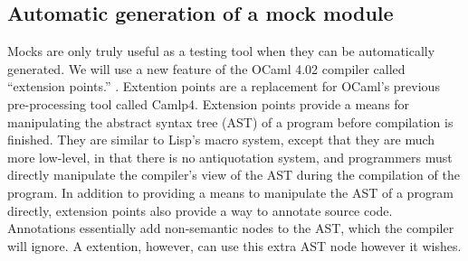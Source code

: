 

\subsection{Automatic generation of a mock module}
\label{application:generation}

Mocks are only truly useful as a testing tool when they can be
automatically generated. We will use a new feature of the OCaml 4.02
compiler called ``extension points.'' \cite{ocaml:spec}. Extention
points are a replacement for OCaml's previous pre-processing tool
called Camlp4. Extension points provide a means for manipulating the
abstract syntax tree (AST) of a program before compilation is
finished. They are similar to Lisp's macro system, except that they
are much more low-level, in that there is no antiquotation system, and
programmers must directly manipulate the compiler's view of the AST
during the compilation of the program. In addition to providing a
means to manipulate the AST of a program directly, extension points
also provide a way to annotate source code. Annotations essentially
add non-semantic nodes to the AST, which the compiler will ignore. A
extention, however, can use this extra AST node however it wishes.

